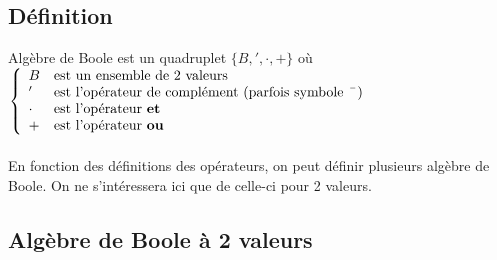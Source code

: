 \subsection{Définition}
Algèbre de Boole est un quadruplet $\{B,',\cdot,+\}$ où
$\left\{
\begin{array}{l l}
	B & \text{est un ensemble de 2 valeurs}\\
	' & \text{est l'opérateur de complément (parfois symbole \ $\bar{ }$ )}\\
	\cdot & \text{est l'opérateur \textbf{et}}\\
	+ & \text{est l'opérateur \textbf{ou}}
\end{array}\right.$\\\\
En fonction des définitions des opérateurs, on peut définir plusieurs algèbre de Boole. On ne s'intéressera ici que de celle-ci pour 2 valeurs.
\subsection{Algèbre de Boole à 2 valeurs}
